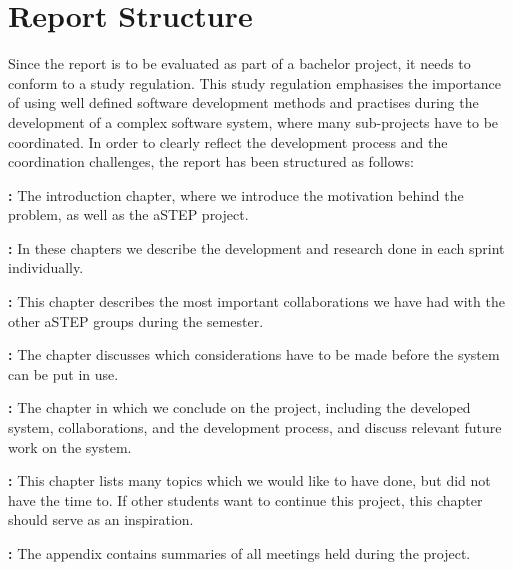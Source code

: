 \section{Report Structure} \label{sec:report_structure}

Since the report is to be evaluated as part of a bachelor project, it needs to conform to a study regulation. This study regulation emphasises the importance of using well defined software development methods and practises during the development of a complex software system, where many sub-projects have to be coordinated. In order to clearly reflect the development process and the coordination challenges, the report has been structured as follows:

\textbf{:} The introduction chapter, where we introduce the motivation behind the problem, as well as the aSTEP project.

\textbf{:} In these chapters we describe the development and research done in each sprint individually.

\textbf{:} This chapter describes the most important collaborations we have had with the other aSTEP groups during the semester.

\textbf{:} The chapter discusses which considerations have to be made before the system can be put in use.

\textbf{:} The chapter in which we conclude on the project, including the developed system, collaborations, and the development process, and discuss relevant future work on the system.

\textbf{:} This chapter lists many topics which we would like to have done, but did not have the time to. If other students want to continue this project, this chapter should serve as an inspiration.

\textbf{:} The appendix contains summaries of all meetings held during the project.